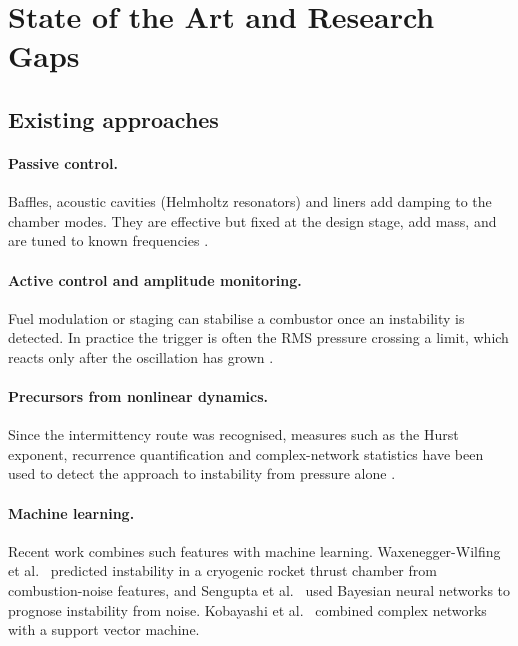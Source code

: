 \documentclass[11pt,a4paper]{article}
\begin{document}
\section{State of the Art and Research Gaps}\label{sec:sota}

\subsection{Existing approaches}
\paragraph{Passive control.} Baffles, acoustic cavities (Helmholtz resonators) and liners add damping to the chamber modes. They are effective but fixed at the design stage, add mass, and are tuned to known frequencies \cite{culick2006}.

\paragraph{Active control and amplitude monitoring.} Fuel modulation or staging can stabilise a combustor once an instability is detected. In practice the trigger is often the RMS pressure crossing a limit, which reacts only after the oscillation has grown \cite{lieuwen2005}.

\paragraph{Precursors from nonlinear dynamics.} Since the intermittency route was recognised, measures such as the Hurst exponent, recurrence quantification and complex-network statistics have been used to detect the approach to instability from pressure alone \cite{nair2014,kobayashi2019}.

\paragraph{Machine learning.} Recent work combines such features with machine learning. Waxenegger-Wilfing et al.\ \cite{waxenegger2021} predicted instability in a cryogenic rocket thrust chamber from combustion-noise features, and Sengupta et al.\ \cite{sengupta2021} used Bayesian neural networks to prognose instability from noise. Kobayashi et al.\ \cite{kobayashi2019} combined complex networks with a support vector machine.
\end{document}
